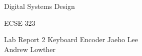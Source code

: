 \documentclass[12pt,letterpaper,titlepage]{article}
\begin{document}
\begin{titlepage}
	\centering
	{\LARGE Digital Systems Design \par}
	{\LARGE ECSE 323 \par}
	\vspace{.5cm}
	{\LARGE Lab Report 2}
	{\LARGE Keyboard Encoder}
	\vfill
	Jaeho Lee \\
	Andrew Lowther \\
\end{titlepage}




\end{document}
